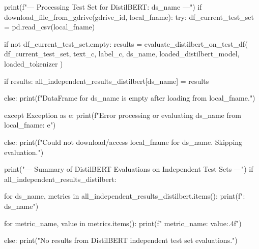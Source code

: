 \begin{ffcode}
        print(f"\n--- Processing Test Set for DistilBERT: {ds_name} ---")
        if download_file_from_gdrive(gdrive_id, local_fname):
            try:
                df_current_test_set = pd.read_csv(local_fname)

                if not df_current_test_set.empty:
                    results = evaluate_distilbert_on_test_df(
                        df_current_test_set,
                        text_c,
                        label_c,
                        ds_name,
                        loaded_distilbert_model,
                        loaded_tokenizer
                    )

                    if results:
                        all_independent_results_distilbert[ds_name] = results

                else:
                    print(f"DataFrame for {ds_name} is empty after loading from {local_fname}.")

            except Exception as e:
                print(f"Error processing or evaluating {ds_name} from {local_fname}: {e}")

        else:
            print(f"Could not download/access {local_fname} for {ds_name}. Skipping evaluation.")

print("\n\n--- Summary of DistilBERT Evaluations on Independent Test Sets ---")
if all_independent_results_distilbert:

    for ds_name, metrics in all_independent_results_distilbert.items():
        print(f"\nDataset: {ds_name}")

        for metric_name, value in metrics.items():
            print(f"  {metric_name}: {value:.4f}")

else:
    print("No results from DistilBERT independent test set evaluations.")
\end{ffcode}